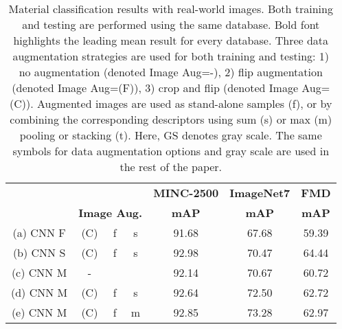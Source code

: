 \documentclass[a4paper,twoside]{article}
\begin{document}
\begin{table*}[t]
\centering
\caption{Material classification results with real-world images. Both training and testing are performed using the same database. Bold font highlights the leading mean result for every database. Three data augmentation strategies are used for both training and testing: 1) no augmentation (denoted Image Aug=-), 2) flip augmentation (denoted Image Aug=(F)), 3) crop and flip (denoted Image Aug=(C)). Augmented images are used as stand-alone samples (f), or by combining the corresponding descriptors using sum (s) or max (m) pooling or stacking (t). Here, GS denotes gray scale. The same symbols for data augmentation options and gray scale are used in the rest of the paper.}
\label{my-label}
\begin{tabular}{cccc|ccc}
\hline
\rowcolor[HTML]{C0C0C0} 
\cellcolor[HTML]{C0C0C0}                                  & \multicolumn{3}{c|}{\cellcolor[HTML]{C0C0C0}}                                      & \textbf{MINC-2500} & \textbf{ImageNet7} & \textbf{FMD}   \\ \cline{5-7} 
\rowcolor[HTML]{C0C0C0} 
\multirow{-2}{*}{\cellcolor[HTML]{C0C0C0}\textbf{Method}} & \multicolumn{3}{c|}{\multirow{-2}{*}{\cellcolor[HTML]{C0C0C0}\textbf{Image Aug.}}} & \textbf{mAP}       & \textbf{mAP}       & \textbf{mAP}   \\
(a) CNN F                                                 & (C)                          & f                        & s                        & 91.68              & 67.68              & 59.39          \\
(b) CNN S                                                 & (C)                          & f                        & s                        & 92.98              & 70.47              & 64.44          \\ \hline
(c) CNN M                                                 & -                            &                          &                          & 92.14              & 70.67              & 60.72          \\
(d) CNN M                                                 & (C)                          & f                        & s                        & 92.64              & 72.50              & 62.72          \\
(e) CNN M                                                 & (C)                          & f                        & m                        & 92.85              & 73.28              & 62.97          \\

\end{tabular}
\end{table*}
\end{document}
